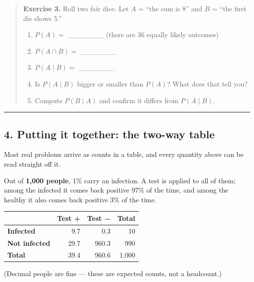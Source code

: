 \documentclass[
]{article}
\newcounter{none} %
\providecommand{\tightlist}{%
  \setlength{\itemsep}{0pt}\setlength{\parskip}{0pt}}
\begin{document}
\begin{quote}
\textbf{Exercise 3.} Roll two fair dice. Let \(A\) = ``the sum is 8''
and \(B\) = ``the first die shows 5.''

\begin{enumerate}
\def\labelenumi{(\alph{enumi})}
\tightlist
\item
  \(P(A)=\) \_\_\_\_\_\_\_ (there are 36 equally likely outcomes)
\item
  \(P(A \cap B)=\) \_\_\_\_\_\_\_
\item
  \(P(A \mid B)=\) \_\_\_\_\_\_\_
\item
  Is \(P(A \mid B)\) bigger or smaller than \(P(A)\)? What does that
  tell you?
\item
  Compute \(P(B \mid A)\) and confirm it differs from \(P(A \mid B)\).
\end{enumerate}
\end{quote}

\begin{center}\rule{0.5\linewidth}{0.5pt}\end{center}

\subsection{4. Putting it together: the two-way
table}\label{putting-it-together-the-two-way-table}

Most real problems arrive as counts in a table, and every quantity above
can be read straight off it.

Out of \textbf{1,000 people}, 1\% carry an infection. A test is applied
to all of them; among the infected it comes back positive 97\% of the
time, and among the healthy it also comes back positive 3\% of the time.

{\def\LTcaptype{none} %
\begin{longtable}[]{@{}lrrr@{}}
\toprule\noalign{}
& Test \textbf{+} & Test \textbf{−} & \textbf{Total} \\
\midrule\noalign{}
\endhead
\bottomrule\noalign{}
\endlastfoot
\textbf{Infected} & 9.7 & 0.3 & 10 \\
\textbf{Not infected} & 29.7 & 960.3 & 990 \\
\textbf{Total} & 39.4 & 960.6 & 1,000 \\
\end{longtable}
}

(Decimal people are fine --- these are expected counts, not a
headcount.)
\end{document}
